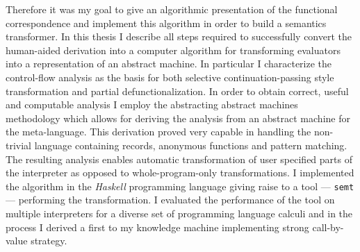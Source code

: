 Therefore it was my goal to give an algorithmic presentation of the functional correspondence and implement this algorithm in order to build a semantics transformer.
In this thesis I describe all steps required to successfully convert the human-aided derivation into a computer algorithm for transforming evaluators into a representation of an abstract machine.
In particular I characterize the control-flow analysis as the basis for both selective continuation-passing style transformation and partial defunctionalization.
In order to obtain correct, useful and computable analysis I employ the abstracting abstract machines methodology \cite{aam} which allows for deriving the analysis from an abstract machine for the meta-language.
This derivation proved very capable in handling the non-trivial language containing records, anonymous functions and pattern matching.
The resulting analysis enables automatic transformation of user specified parts of the interpreter as opposed to whole-program-only transformations.
I implemented the algorithm in the \emph{Haskell} programming language giving raise to a tool --- \texttt{semt} --- performing the transformation.
I evaluated the performance of the tool on multiple interpreters for a diverse set of programming language calculi and in the process I derived a first to my knowledge machine implementing strong call-by-value strategy.


